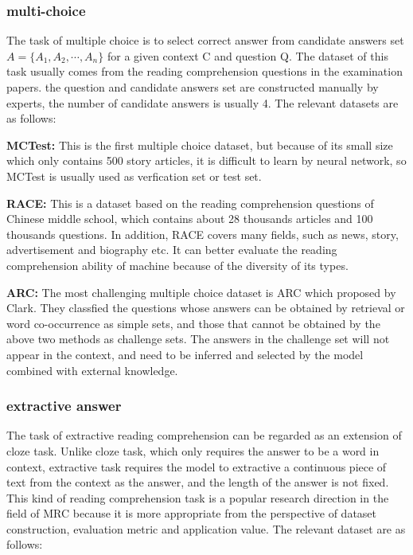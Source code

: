 \subsubsection{multi-choice}
The task of multiple choice is to select correct answer from candidate answers set $A=\{A_1,A_2,\cdots,A_n\}$ for 
a given context C and question Q. The dataset of this task usually comes from the reading comprehension questions in 
the examination papers. the question and candidate answers set are constructed manually by experts, the number of candidate answers is usually 4. 
The relevant datasets are as follows: 

\noindent\textbf{MCTest: }This is the first multiple choice dataset, but because of its small size which only contains 500 story articles, 
it is difficult to learn by neural network, so MCTest is usually used as verfication set or test set.

\noindent\textbf{RACE: }This is a dataset based on the reading comprehension questions of Chinese middle school, which contains about 28 
thousands articles and 100 thousands questions. In addition, RACE covers many fields, such as news, story, advertisement and biography etc. 
It can better evaluate the reading comprehension ability of machine because of the diversity of its types.

\noindent\textbf{ARC: }The most challenging multiple choice dataset is ARC which proposed by Clark. They classfied the questions whose answers can be 
obtained by retrieval or word co-occurrence as simple sets, and those that cannot be obtained by the above two methods as challenge sets. The answers in the challenge set will not 
appear in the context, and need to be inferred and selected by the model combined with external knowledge.

\subsubsection{extractive answer}
The task of extractive reading comprehension can be regarded as an extension of cloze task. Unlike cloze task, which only requires the 
answer to be a word in context, extractive task requires the model to extractive a continuous piece of text from the context as 
the answer, and the length of the answer is not fixed. This kind of reading comprehension task is a popular research direction 
in the field of MRC because it is more appropriate from the perspective of dataset construction, evaluation metric and application value. 
The relevant dataset are as follows:

